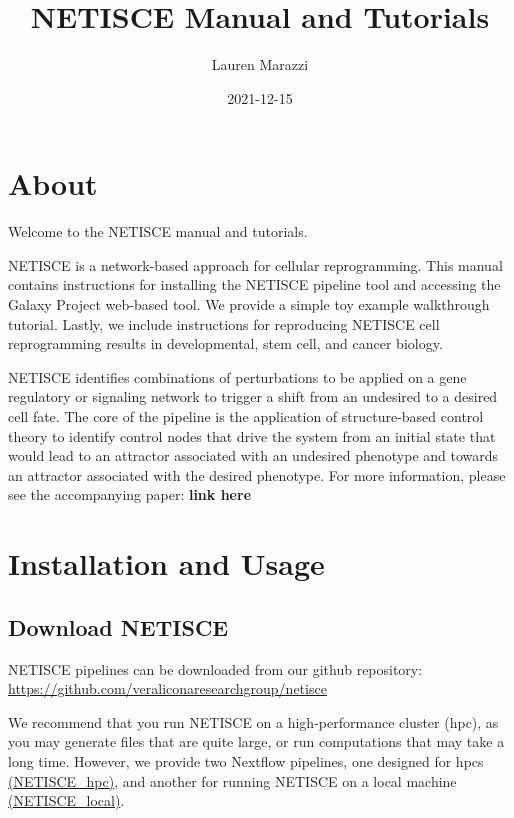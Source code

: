 \documentclass[
]{book}
\title{NETISCE Manual and Tutorials}
\author{Lauren Marazzi}
\date{2021-12-15}
\begin{document}
\maketitle

{
\setcounter{tocdepth}{1}
\tableofcontents
}
\hypertarget{about}{%
\chapter{About}\label{about}}

Welcome to the NETISCE manual and tutorials.

NETISCE is a network-based approach for cellular reprogramming. This manual contains instructions for installing the NETISCE pipeline tool and accessing the Galaxy Project web-based tool. We provide a simple toy example walkthrough tutorial. Lastly, we include instructions for reproducing NETISCE cell reprogramming results in developmental, stem cell, and cancer biology.

NETISCE identifies combinations of perturbations to be applied on a gene regulatory or signaling network to trigger a shift from an undesired to a desired cell fate. The core of the pipeline is the application of structure-based control theory to identify control nodes that drive the system from an initial state that would lead to an attractor associated with an undesired phenotype and towards an attractor associated with the desired phenotype. For more information, please see the accompanying paper: \textbf{link here}

\hypertarget{installation-and-usage}{%
\chapter{Installation and Usage}\label{installation-and-usage}}

\hypertarget{download-netisce}{%
\section{Download NETISCE}\label{download-netisce}}

NETISCE pipelines can be downloaded from our github repository: \url{https://github.com/veraliconaresearchgroup/netisce}

We recommend that you run NETISCE on a high-performance cluster (hpc), as you may generate files that are quite large, or run computations that may take a long time. However, we provide two Nextflow pipelines, one designed for hpcs \href{https://github.com/VeraLiconaResearchGroup/Netisce/tree/main/NETICSE_hpc}{(NETISCE\_hpc)}, and another for running NETISCE on a local machine \href{https://github.com/VeraLiconaResearchGroup/Netisce/tree/main/NETICSE_local}{(NETISCE\_local)}.
\end{document}
